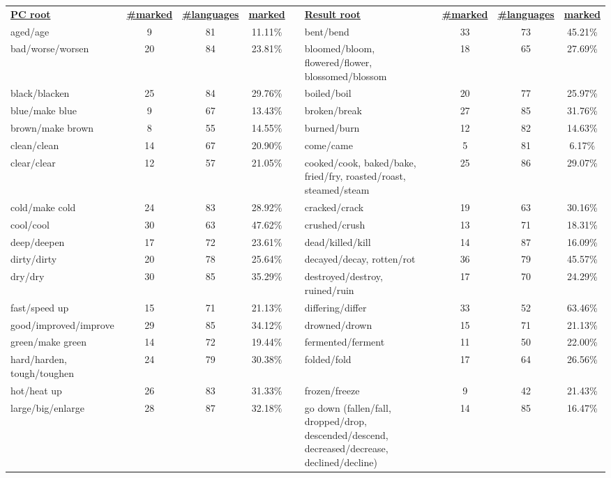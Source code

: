 \begin{tabular}{p{3cm}ccccp{3cm}ccc}
\underline{\textbf{PC root}} & \underline{\textbf{\#marked}} & \underline{\textbf{\#languages}} & \underline{\textbf{marked}} & & \underline{\textbf{Result root}} & \underline{\textbf{\#marked}} & \underline{\textbf{\#languages}} & \underline{\textbf{marked}} \\
aged/age & 9 & 81 & 11.11\% & & bent/bend & 33 & 73 & 45.21\% \\
bad/worse/worsen & 20 & 84 & 23.81\% & & bloomed/bloom, flowered/flower, blossomed/blossom & 18 & 65 & 27.69\% \\
black/blacken & 25 & 84 & 29.76\% & & boiled/boil & 20 & 77 & 25.97\% \\
blue/make blue & 9 & 67 & 13.43\% & & broken/break & 27 & 85 & 31.76\% \\
brown/make brown & 8 & 55 & 14.55\% & & burned/burn & 12 & 82 & 14.63\% \\
clean/clean & 14 & 67 & 20.90\% & & come/came & 5 & 81 & 6.17\% \\
clear/clear & 12 & 57 & 21.05\% & & cooked/cook, baked/bake, fried/fry, roasted/roast, steamed/steam & 25 & 86 & 29.07\% \\
cold/make cold & 24 & 83 & 28.92\% & & cracked/crack & 19 & 63 & 30.16\% \\
cool/cool & 30 & 63 & 47.62\% & & crushed/crush & 13 & 71 & 18.31\% \\
deep/deepen & 17 & 72 & 23.61\% & & dead/killed/kill & 14 & 87 & 16.09\% \\
dirty/dirty & 20 & 78 & 25.64\% & & decayed/decay, rotten/rot & 36 & 79 & 45.57\% \\
dry/dry & 30 & 85 & 35.29\% & & destroyed/destroy, ruined/ruin & 17 & 70 & 24.29\% \\
fast/speed up & 15 & 71 & 21.13\% & & differing/differ & 33 & 52 & 63.46\% \\
good/improved/improve & 29 & 85 & 34.12\% & & drowned/drown & 15 & 71 & 21.13\% \\
green/make green & 14 & 72 & 19.44\% & & fermented/ferment & 11 & 50 & 22.00\% \\
hard/harden, tough/toughen & 24 & 79 & 30.38\% & & folded/fold & 17 & 64 & 26.56\% \\
hot/heat up & 26 & 83 & 31.33\% & & frozen/freeze & 9 & 42 & 21.43\% \\
large/big/enlarge & 28 & 87 & 32.18\% & & go down (fallen/fall, dropped/drop, descended/descend, decreased/decrease, declined/decline) & 14 & 85 & 16.47\% \\

\end{tabular}
